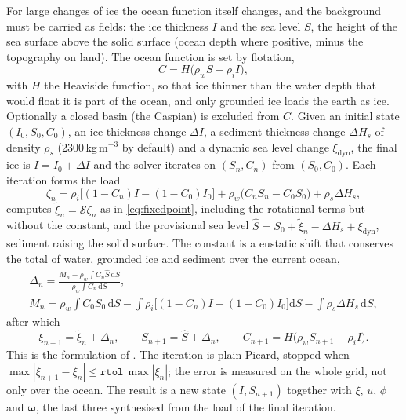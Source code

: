 \documentclass[11pt,a4paper]{article}
\newcommand{\dd}{\mathrm{d}}
\numberwithin{equation}{section}
\begin{document}
For large changes of ice the ocean function itself changes, and the background
must be carried as fields: the ice thickness $I$ and the sea level $S$, the
height of the sea surface above the solid surface (ocean depth where positive,
minus the topography on land). The ocean function is set by flotation,
\begin{equation}
C = H\big(\rho_{w}S - \rho_{i}I\big),
\label{eq:flotation}
\end{equation}
with $H$ the Heaviside function, so that ice thinner than the water depth that
would float it is part of the ocean, and only grounded ice loads the earth as
ice. Optionally a closed basin (the Caspian) is excluded from $C$. Given an
initial state $(I_{0},S_{0},C_{0})$, an ice thickness change $\Delta I$, a
sediment thickness change $\Delta H_{s}$ of density $\rho_{s}$ (2300\,kg\,m$^{-3}$
by default) and a dynamic sea level change $\xi_{\mathrm{dyn}}$, the final ice
is $I=I_{0}+\Delta I$ and the solver iterates on $(S_{n},C_{n})$ from
$(S_{0},C_{0})$. Each iteration forms the load
\begin{equation}
\zeta_{n} = \rho_{i}\big[(1-C_{n})I - (1-C_{0})I_{0}\big]
 + \rho_{w}\big(C_{n}S_{n} - C_{0}S_{0}\big) + \rho_{s}\Delta H_{s},
\end{equation}
computes $\tilde\xi_{n}=\mathcal{S}\zeta_{n}$ as in \eqref{eq:fixedpoint},
including the rotational terms but without the constant, and the provisional sea
level $\hat S = S_{0}+\tilde\xi_{n}-\Delta H_{s}+\xi_{\mathrm{dyn}}$, sediment
raising the solid surface. The constant is a eustatic shift that conserves the
total of water, grounded ice and sediment over the current ocean,
\begin{gather}
\Delta_{n} = \frac{M_{n} - \rho_{w}\int C_{n}\hat S\,\dd S}{\rho_{w}\int C_{n}\,\dd S},\\
M_{n} = \rho_{w}\!\int C_{0}S_{0}\,\dd S
 - \int\rho_{i}\big[(1-C_{n})I-(1-C_{0})I_{0}\big]\dd S
 - \int\rho_{s}\Delta H_{s}\,\dd S,
\end{gather}
after which
\begin{equation}
\xi_{n+1} = \tilde\xi_{n}+\Delta_{n},\qquad
S_{n+1} = \hat S + \Delta_{n},\qquad
C_{n+1} = H\big(\rho_{w}S_{n+1}-\rho_{i}I\big).
\end{equation}
This is the formulation of \citet{KendallEtAl2005}. The iteration is plain
Picard, stopped when $\max|\xi_{n+1}-\xi_{n}|\le\texttt{rtol}\,\max|\xi_{n}|$;
the error is measured on the whole grid, not only over the ocean. The result is a new state
$(I,S_{n+1})$ together with $\xi$, $u$, $\phi$ and $\bm{\omega}$, the last three
synthesised from the load of the final iteration.
\end{document}
